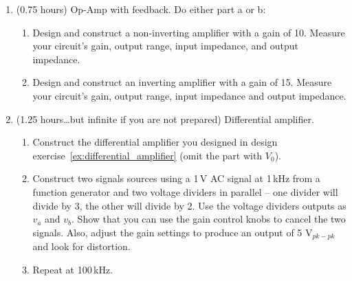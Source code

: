 \documentclass{article}
\begin{document}
\begin{enumerate}
\item (0.75 hours) Op-Amp with feedback.  Do either part a or b:
\begin{enumerate}
\item Design and construct a non-inverting amplifier with a gain of 10. Measure your circuit's gain, output range, input impedance, and output impedance.
\item Design and construct an inverting amplifier with a gain of 15. Measure your circuit's gain, output range, input impedance and output impedance.
\end{enumerate}

\item (1.25 hours\ldots but infinite if you are not prepared) Differential amplifier.
\begin{enumerate}
\item Construct the differential amplifier you designed in design exercise~\ref{ex:differential_amplifier} (omit the part with $V_0$).
\item Construct two signals sources using a 1\,V AC signal at 1\,kHz from a function generator and two voltage dividers in parallel -- one divider will divide by 3, the other will divide by 2. Use the voltage dividers outputs as $v_a$ and $v_b$. Show that you can use the gain control knobs to cancel the two signals. Also, adjust the gain settings to produce an output of 5 V$_{pk-pk}$ and look for distortion.
\item Repeat at 100\,kHz. 
\end{enumerate}
\end{enumerate}
\end{document}
